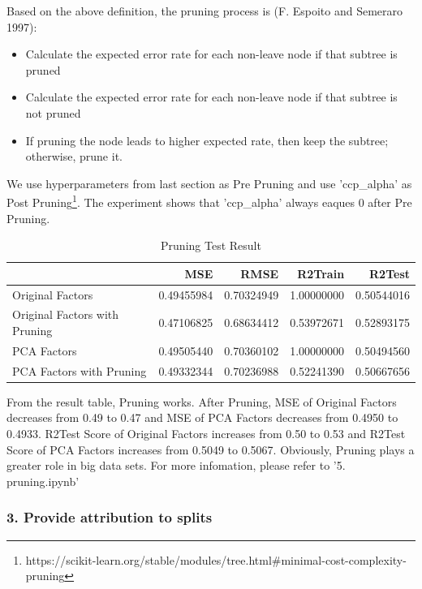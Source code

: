 \documentclass[UTF8]{ctexart}
\begin{document}
Based on the above definition, the pruning process is (F. Espoito and Semeraro 1997):

\begin{itemize}
	\item Calculate the expected error rate for each non-leave node if that subtree is pruned
	\item Calculate the expected error rate for each non-leave node if that subtree is not pruned
	\item If pruning the node leads to higher expected rate, then keep the subtree; otherwise, prune it.
\end{itemize}

We use hyperparameters from last section as Pre Pruning and use 'ccp\_alpha' as Post Pruning\footnote{https://scikit-learn.org/stable/modules/tree.html\#minimal-cost-complexity-pruning}. The experiment shows that 'ccp\_alpha' always eaques 0 after Pre Pruning.

\begin{table}[htbp]
	\centering
	\begin{tabular}{lrrrr}
		\toprule
		                              & MSE        & RMSE       & R2Train    & R2Test     \\
		\midrule
		Original Factors              & 0.49455984 & 0.70324949 & 1.00000000 & 0.50544016 \\
		Original Factors with Pruning & 0.47106825 & 0.68634412 & 0.53972671 & 0.52893175 \\
		PCA Factors                   & 0.49505440 & 0.70360102 & 1.00000000 & 0.50494560 \\
		PCA Factors with Pruning      & 0.49332344 & 0.70236988 & 0.52241390 & 0.50667656 \\
		\bottomrule
	\end{tabular}
	\setlength{\abovecaptionskip}{0.3cm}
	\setlength{\belowcaptionskip}{0cm}

	\caption{Pruning Test Result}
\end{table}

From the result table, Pruning works. After Pruning, MSE of Original Factors decreases from 0.49 to 0.47 and MSE of PCA Factors decreases from 0.4950 to 0.4933. R2Test Score of Original Factors increases from 0.50 to 0.53 and R2Test Score of PCA Factors increases from 0.5049 to 0.5067. Obviously, Pruning plays a greater role in big data sets. For more infomation, please refer to '5. pruning.ipynb'

\subsubsection*{3. Provide attribution to splits}
\end{document}
